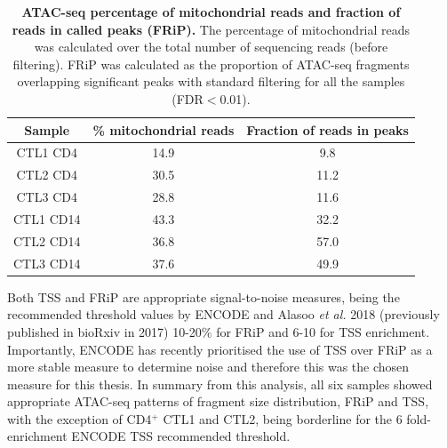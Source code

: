 \begin{table}[htbp]
\centering
\begin{tabular}{@{} c c c}
\toprule
\textbf{Sample} & \textbf{\% mitochondrial reads} & \textbf{Fraction of reads in peaks} \\
\midrule
\midrule
CTL1 CD4 & 14.9 & 9.8 \\
CTL2 CD4 & 30.5 & 11.2 \\
CTL3 CD4 & 28.8 & 11.6 \\
CTL1 CD14 & 43.3 & 32.2 \\
CTL2 CD14 & 36.8 & 57.0 \\
CTL3 CD14 & 37.6 & 49.9 \\
\bottomrule
\end{tabular}
\medskip %
\caption[ATAC-seq percentage of mitochondrial reads and fraction of reads in called peaks (FRiP).]{\textbf{ATAC-seq percentage of mitochondrial reads and fraction of reads in called peaks (FRiP).} The percentage of mitochondrial reads was calculated over the total number of sequencing reads (before filtering). FRiP was calculated as the proportion of ATAC-seq fragments overlapping significant peaks with standard filtering for all the samples (FDR$<$0.01).}
\label{tab:ATAC_MT_fraction_reads_in_peaks}
\end{table}



Both TSS and FRiP are appropriate signal-to-noise measures, being the recommended threshold values by ENCODE and Alasoo \textit{et al.} 2018 (previously published in bioRxiv in 2017) 10-20\% for FRiP and 6-10 for TSS enrichment. Importantly, ENCODE has recently prioritised the use of TSS over FRiP as a more stable measure to determine noise and therefore this was the chosen measure for this thesis. In summary from this analysis, all six samples showed appropriate ATAC-seq patterns of fragment size distribution, FRiP and TSS, with the exception of CD4$^+$ CTL1 and CTL2, being borderline for the 6 fold-enrichment ENCODE TSS recommended threshold.



